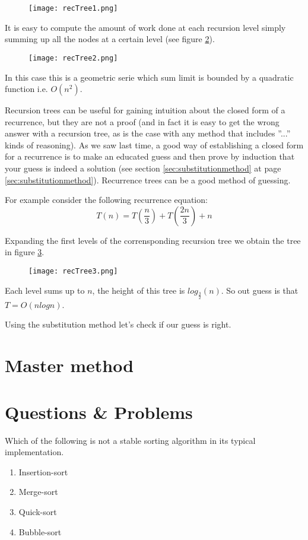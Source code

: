 \begin{figure}
\label{fig:rectree1}
		\texttt{[image: recTree1.png]}
\end{figure}
It is easy to compute the amount of work done at each recursion level simply summing up all the nodes at a certain level (see figure \ref{fig:rectree2}).
\begin{figure}
\label{fig:rectree2}
		\texttt{[image: recTree2.png]}
\end{figure}

In this case this is a geometric serie which sum limit is bounded by a quadratic function i.e. $O(n^2)$. 

Recursion trees can be useful for gaining intuition about the closed form of a recurrence, but they are not a proof (and in fact it is easy to get the wrong answer with a recursion tree, as is the case with any method that includes ''...'' kinds of reasoning). As we saw last time, a good way of establishing a closed form for a recurrence is to make an educated guess and then prove by induction that your guess is indeed a solution (see section \ref{sec:substitutionmethod} at page \ref{sec:substitutionmethod}). Recurrence trees can be a good method of guessing.


For example consider the following recurrence equation:
\[ T(n) = T(\frac{n}{3}) + T(\frac{2n}{3}) + n\]

Expanding the first levels of the corrensponding recursion tree we obtain the tree in figure \ref{fig:rectree3}.
\begin{figure}
\label{fig:rectree3}
		\texttt{[image: recTree3.png]}
\end{figure}

Each level sums up to $n$, the height of this tree is $log_{\frac{3}{2}}(n)$. So out guess is that $T=O(nlogn)$.

Using the substitution method let's check if our guess is right.

\section{Master method}




\section{Questions \& Problems}
\begin{problem}
Which of the following is not a stable sorting algorithm in its typical implementation.
\begin{enumerate}
\item Insertion-sort
\item Merge-sort
\item Quick-sort
\item Bubble-sort
\end{enumerate}

\end{problem}

